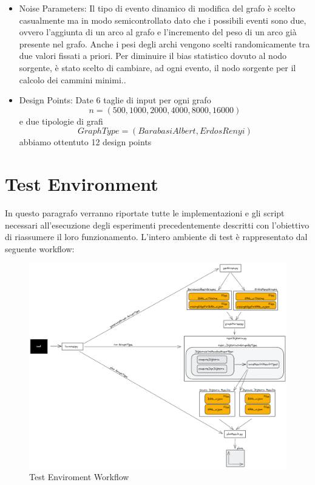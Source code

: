 \documentclass[a4paper]{article}
\begin{document}
\begin{itemize}
\item Noise Parameters: Il tipo di evento dinamico di modifica del grafo è scelto casualmente ma in modo semicontrollato dato che i possibili eventi sono due, ovvero l'aggiunta di un arco al grafo e l'incremento del peso di un arco già presente nel grafo. Anche i pesi degli archi vengono scelti randomicamente tra due valori fissati a priori. Per diminuire il bias statistico dovuto al nodo sorgente, è stato scelto di cambiare, ad ogni evento, il nodo sorgente per il calcolo dei cammini minimi..
\item Design Points: Date 6 taglie di input per ogni grafo
\[n = (500,1000,2000,4000,8000,16000)\]
e due tipologie di grafi \[GraphType = (BarabasiAlbert, ErdosRenyi)\] abbiamo ottentuto 12 design points
\end{itemize}
\section{Test Environment}
In questo paragrafo verranno riportate tutte le implementazioni e gli script necessari all'esecuzione degli esperimenti precedentemente descritti con l'obiettivo di riassumere il loro funzionamento.
L'intero ambiente di test è rappresentato dal seguente workflow:\\
\begin{figure}[!h]
\includegraphics[scale=0.17]{img/workflow}
\centering
\caption{Test Enviroment Workflow}
\end{figure}
\newpage
\end{document}
